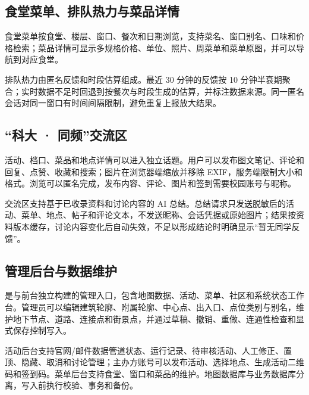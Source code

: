 \documentclass[UTF8,a4paper,12pt]{ctexart}
\begin{document}
\subsection{食堂菜单、排队热力与菜品详情}
食堂菜单按食堂、楼层、窗口、餐次和日期浏览，支持菜名、窗口别名、口味和价格检索；菜品详情可显示多规格价格、单位、照片、周菜单和菜单原图，并可以导航到对应食堂。\par
排队热力由匿名反馈和时段估算组成。最近 30 分钟的反馈按 10 分钟半衰期聚合；实时数据不足时回退到按餐次与时段生成的估算，并标注数据来源。同一匿名会话对同一窗口有时间间隔限制，避免重复上报放大结果。\par
\subsection{“科大 · 同频”交流区}
活动、档口、菜品和地点详情可以进入独立话题。用户可以发布图文笔记、评论和回复、点赞、收藏和搜索；图片在浏览器端缩放并移除 EXIF，服务端限制大小和格式。浏览可以匿名完成，发布内容、评论、图片和签到需要校园账号与昵称。\par
交流区支持基于已收录资料和讨论内容的 AI 总结。总结请求只发送脱敏后的活动、菜单、地点、帖子和评论文本，不发送昵称、会话凭据或原始图片；结果按资料版本缓存，讨论内容变化后自动失效，不足以形成结论时明确显示“暂无同学反馈”。\par
\subsection{管理后台与数据维护}
\texttt{} 是与前台独立构建的管理入口，包含地图数据、活动、菜单、社区和系统状态工作台。管理员可以编辑建筑轮廓、附属轮廓、中心点、出入口、点位类别与别名，维护地下节点、道路、连接点和街景点，并通过草稿、撤销、重做、连通性检查和显式保存控制写入。\par
活动后台支持官网/邮件数据管道状态、运行记录、待审核活动、人工修正、置顶、隐藏、取消和讨论管理；主办方账号可以发布活动、选择地点、生成活动二维码和签到码。菜单后台支持食堂、窗口和菜品的维护。地图数据库与业务数据库分离，写入前执行校验、事务和备份。\par
\end{document}
